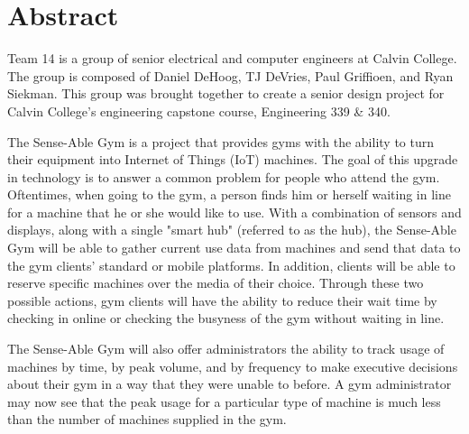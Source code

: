 \documentclass[PPFS.tex]{template/subfiles}
\begin{document}
\section*{Abstract}

Team 14 is a group of senior electrical and computer engineers at Calvin College. The group is composed of Daniel DeHoog, TJ DeVries, Paul Griffioen, and Ryan Siekman. This group was brought together to create a senior design project for Calvin College's engineering capstone course, Engineering 339 \& 340.

The Sense-Able Gym is a project that provides gyms with the ability to turn their equipment into Internet of Things (IoT) machines. The goal of this upgrade in technology is to answer a common problem for people who attend the gym. Oftentimes, when going to the gym, a person finds him or herself waiting in line for a machine that he or she would like to use.  With a combination of sensors and displays, along with a single
"smart hub" (referred to as the hub), the Sense-Able Gym will be able to gather current use data from machines and send that data to the gym clients' standard or mobile platforms. In addition, clients will be able to reserve specific machines over the media of their choice. Through these two possible actions, gym clients will have the ability to reduce their wait time by checking in online or checking the busyness of the gym without waiting in line.

The Sense-Able Gym will also offer administrators the ability to track usage of machines by time, by peak volume, and by frequency to make executive decisions about their gym in a way that they were unable to before. A gym administrator may now see that the peak usage for a particular type of machine is much less than the number of machines supplied in the gym.
\end{document}
